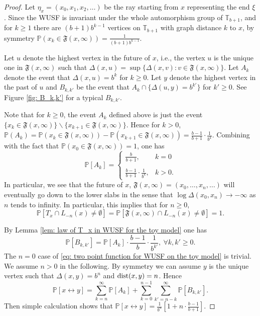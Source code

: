 \documentclass[12pt]{article}
\numberwithin{equation}{section}
\newcommand{\1}{\mathbf{1}}
\begin{document}
 \begin{proof}
 		Let $\eta_x=(x_0,x_1,x_2,\ldots)$ be the ray starting from $x$ representing the end $\xi$. 
 	Since the WUSF is invariant under the whole automorphism group of $\mathbb{T}_{b+1}$, and for $k\geq 1$ there are $(b+1)b^{k-1}$ vertices on  $\mathbb{T}_{b+1}$ with graph distance $k$ to $x$,  by symmetry  $\mathbb{P}(x_k\in \mathfrak{F}(x,\infty))=\frac{1}{(b+1)b^{k-1}}$. 
 	
 		Let $u$ denote the highest vertex in the future of $x$, i.e., the vertex  $u$ is the unique one in $\mathfrak{F}(x,\infty)$  such that $\Delta(x,u)=\sup\{\Delta(x,v): v\in\mathfrak{F}(x,\infty) \}$. 
 	Let $A_k$ denote the event that $\Delta(x,u)=b^k$ for $k\geq0$.  Let $y$ denote the highest vertex in the past of $u$ and $B_{k,k'}$ be the event that $A_k\cap \{\Delta(u,y)=b^{k'} \}$ for $k'\geq0$. See Figure \ref{fig: B_k,k'} for a typical $B_{k,k'}$.
 	
 	Note that for $k\geq0$, the event $A_k$ defined above is just the event $\{x_k\in \mathfrak{F}(x,\infty) \}\backslash \{x_{k+1}\in \mathfrak{F}(x,\infty)  \}$. Hence for $k>0$, $\mathbb{P}(A_k)=\mathbb{P}(x_k\in \mathfrak{F}(x,\infty))-\mathbb{P}(x_{k+1}\in \mathfrak{F}(x,\infty))=\frac{b-1}{b+1}\cdot\frac{1}{b^k}$. Combining with the fact that $\mathbb{P}(x_0\in\mathfrak{F}(x,\infty))=1$, one has 
 	\[
 	\mathbb{P}[A_k]=\left\{
 	\begin{array}{cc}
 	\frac{b}{b+1}, & k=0\\
 	& \\
 	\frac{b-1}{b+1}\cdot\frac{1}{b^k}, & k>0.
 	\end{array}
 	\right.
 	\]
 	In particular, we see that the future of $x$, $\mathfrak{F}(x,\infty)=(x_0,\ldots,x_n,\ldots)$ will eventually go down to the lower slabs in the sense that $\log \Delta(x_0,x_n)\rightarrow-\infty$ as $n$ tends to infinity.  In particular, this implies that for $n\geq0$, \[
 	\mathbb{P}[T_x\cap L_{-n}(x)\neq \emptyset]=	\mathbb{P}[\mathfrak{F}(x,\infty)\cap L_{-n}(x)\neq \emptyset]=1.
 	\]
 	
 By Lemma \ref{lem: law of T_x in WUSF for the toy model}  one has 
 	\[
 	\mathbb{P}[B_{k,k'}]=\mathbb{P}[A_k]\cdot\frac{b-1}{b}\cdot\frac{1}{b^{k'}}, \ \forall k, k'\geq0 .
 	\]
 	The $n=0$ case of \eqref{eq: two point function for WUSF on the toy model} is trivial. We assume $n>0$ in the following. 
 	By symmetry we can assume $y$ is the unique vertex such that $\Delta(x,y)=b^n$ and $\textnormal{dist}(x,y)=n$. Hence 
 	\[
 	\mathbb{P}[x\leftrightarrow y]=\sum_{k=n}^{\infty}\mathbb{P}[A_k ]+\sum_{k=0}^{n-1}\sum_{k'=n-k}^{\infty}\mathbb{P}[B_{k,k'}].
 	\] 
 	Then simple calculation shows that $\mathbb{P}[x\leftrightarrow y]=\frac{1}{b^n}[1+n\cdot\frac{b-1}{b+1}]$.
 \end{proof}
 
\end{document}
